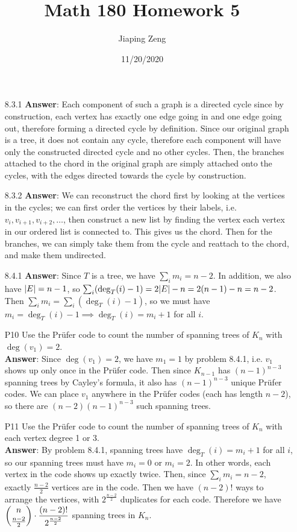 \documentclass{article}
\title{Math 180 Homework 5}
\date{11/20/2020}
\author{Jiaping Zeng}
\begin{document}
\maketitle

\begin{itemize}
      \item [8.3.1]
            \textbf{Answer}: Each component of such a graph is a directed cycle since by construction, each vertex has exactly one edge going in and one edge going out, therefore forming a directed cycle by definition. Since our original graph is a tree, it does not contain any cycle, therefore each component will have only the constructed directed cycle and no other cycles. Then, the branches attached to the chord in the original graph are simply attached onto the cycles, with the edges directed towards the cycle by construction.
      \item [8.3.2]
            \textbf{Answer}: We can reconstruct the chord first by looking at the vertices in the cycles; we can first order the vertices by their labels, i.e. $v_i,v_{i+1},v_{i+2},\ldots$, then construct a new list by finding the vertex each vertex in our ordered list is connected to. This gives us the chord. Then for the branches, we can simply take them from the cycle and reattach to the chord, and make them undirected.
      \item [8.4.1]
            \textbf{Answer}: Since $T$ is a tree, we have $\sum_im_i=n-2$. In addition, we also have $\abs{E}=n-1$, so $\sum_i(\deg_T(i)-1)=2\abs{E}-n=2(n-1)-n=n-2$. Then $\sum_im_i=\sum_i(\deg_T(i)-1)$, so we must have $m_i=\deg_T(i)-1\implies\deg_T(i)=m_i+1$ for all $i$.
      \item [P10] Use the Prüfer code to count the number of spanning trees of $K_n$ with $\deg(v_1)=2$.\\
            \textbf{Answer}: Since $\deg(v_1)=2$, we have $m_1=1$ by problem 8.4.1, i.e. $v_1$ shows up only once in the Prüfer code. Then since $K_{n-1}$ has $(n-1)^{n-3}$ spanning trees by Cayley's formula, it also has $(n-1)^{n-3}$ unique Prüfer codes. We can place $v_1$ anywhere in the Prüfer codes (each has length $n-2$), so there are $(n-2)(n-1)^{n-3}$ such spanning trees.
      \item [P11] Use the Prüfer code to count the number of spanning trees of $K_n$ with each vertex degree 1 or 3.\\
            \textbf{Answer}: By problem 8.4.1, spanning trees have $\deg_T(i)=m_i+1$ for all $i$, so our spanning trees must have $m_i=0$ or $m_i=2$. In other words, each vertex in the code shows up exactly twice. Then, since $\sum_im_i=n-2$, exactly $\frac{n-2}{2}$ vertices are in the code. Then we have $(n-2)!$ ways to arrange the vertices, with $2^\frac{n-2}{2}$ duplicates for each code. Therefore we have $\mathlarger{\binom{n}{\frac{n-2}{2}}\cdot\frac{(n-2)!}{2^\frac{n-2}{2}}}$ spanning trees in $K_n$.
\end{itemize}
\end{document}
